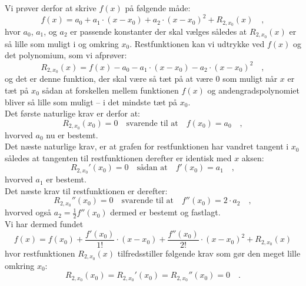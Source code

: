 Vi prøver derfor at skrive $f(x)$  på følgende måde:
\begin{equation}
f(x) = a_{0} + a_{1}\cdot(x-x_{0}) + a_{2}\cdot(x-x_{0})^{2} + R_{2, x_{0}}(x) \quad ,
\end{equation}
hvor $a_{0}$, $a_{1}$, og $a_{2}$ er passende konstanter der skal vælges således at 
$R_{2, x_{0}}(x)$ er så lille som muligt i og omkring $x_{0}$. Restfunktionen kan vi udtrykke ved $f(x)$ og det polynomium, som vi afprøver:
\begin{equation}
R_{2, x_{0}}(x) = f(x) - a_{0} - a_{1}\cdot(x-x_{0}) - a_{2}\cdot(x-x_{0})^{2} \quad,
\end{equation}
og det er denne funktion, der skal være så tæt på at være $0$ som muligt når $x$ er tæt på $x_{0}$ sådan at forskellen mellem funktionen $f(x)$ og andengradspolynomiet bliver så lille som muligt -- i det mindste tæt på $x_{0}$.\\

Det første naturlige krav er derfor at:
\begin{equation}
R_{2, x_{0}}(x_{0}) = 0 \quad \textrm{svarende til at} \quad f(x_{0}) = a_{0} \quad ,
\end{equation}
hvorved $a_{0}$ nu er bestemt. \\

Det næste naturlige krav, er at grafen for restfunktionen har vandret tangent i $x_{0}$ således at tangenten til restfunktionen derefter er identisk med $x$ aksen:
\begin{equation}
R_{2, x_{0}}'(x_{0}) = 0 \quad \textrm{sådan at} \quad f'(x_{0}) = a_{1} \quad ,
\end{equation}
hvorved $a_{1}$ er bestemt. \\


Det næste krav til restfunktionen er derefter:
\begin{equation}
R_{2, x_{0}}''(x_{0}) = 0 \quad \textrm{svarende til at} \quad f''(x_{0}) = 2\cdot a_{2} \quad ,
\end{equation}
hvorved også $a_{2} = \frac{1}{2}f''(x_{0})$ dermed er bestemt og fastlagt.\\

Vi har dermed fundet
\begin{equation}
f(x) = f(x_{0}) + \frac{f'(x_{0})}{1!}\cdot(x-x_{0}) + \frac{f''(x_{0})}{2!}\cdot(x-x_{0})^{2} + R_{2, x_{0}}(x)
\end{equation}
hvor restfunktionen $R_{2, x_{0}}(x)$ tilfredsstiller følgende krav som gør den meget lille omkring $x_{0}$:
\begin{equation}
R_{2, x_{0}}(x_{0}) = R_{2, x_{0}}'(x_{0}) = R_{2, x_{0}}''(x_{0}) = 0 \quad.
\end{equation}

